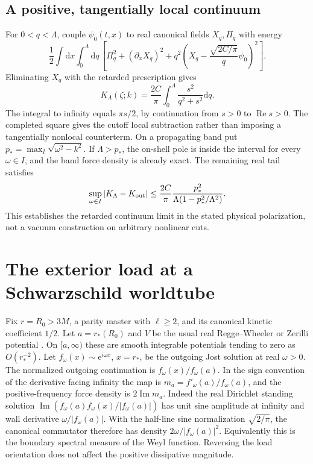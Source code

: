 \documentclass[11pt]{article}
\newcommand{\dd}{\mathrm d}
\newcommand{\e}{\mathrm e}
\begin{document}
\subsection{A positive, tangentially local continuum}
For \(0<q<\Lambda\), couple \(\psi_0(t,x)\) to real canonical fields \(X_q,\Pi_q\) with energy
\[
 \frac12\int\dd x\int_0^\Lambda\dd q\,
 \left[\Pi_q^2+(\partial_x X_q)^2+
 q^2\left(X_q-\frac{\sqrt{2C/\pi}}q\psi_0\right)^2\right].
\]
Eliminating \(X_q\) with the retarded prescription gives
\[
 K_\Lambda(\zeta;k)=\frac{2C}{\pi}\int_0^\Lambda
 \frac{s^2}{q^2+s^2}\dd q .
\]
The integral to infinity equals \(\pi s/2\), by continuation from \(s>0\) to \(\operatorname{Re}s>0\). The completed square gives the cutoff local subtraction rather than imposing a tangentially nonlocal counterterm. On a propagating band put \(p_*=\max_I\sqrt{\omega^2-k^2}\). If \(\Lambda>p_*\), the on-shell pole is inside the interval for every \(\omega\in I\), and the band force density is already exact. The remaining real tail satisfies
\[
 \sup_{\omega\in I}|K_\Lambda-K_{\rm out}|
 \le\frac{2C}{\pi}\frac{p_*^2}{\Lambda(1-p_*^2/\Lambda^2)}.
\]
This establishes the retarded continuum limit in the stated physical polarization, not a vacuum construction on arbitrary nonlinear cuts.

\section{The exterior load at a Schwarzschild worldtube}
Fix \(r=R_0>3M\), a parity master with \(\ell\ge2\), and its canonical kinetic coefficient \(1/2\). Let \(a=r_*(R_0)\) and \(V\) be the usual real Regge--Wheeler or Zerilli potential \cite{Lau}. On \([a,\infty)\) these are smooth integrable potentials tending to zero as \(O(r_*^{-2})\). Let \(f_\omega(x)\sim\e^{i\omega x}\), \(x=r_*\), be the outgoing Jost solution at real \(\omega>0\). The normalized outgoing continuation is \(f_\omega(x)/f_\omega(a)\). In the sign convention of the derivative facing infinity the map is \(m_a=f'_\omega(a)/f_\omega(a)\), and the positive-frequency force density is \(2\operatorname{Im}m_a\). Indeed the real Dirichlet standing solution \(\operatorname{Im}(\overline f_\omega(a)f_\omega(x)/|f_\omega(a)|)\) has unit sine amplitude at infinity and wall derivative \(\omega/|f_\omega(a)|\). With the half-line sine normalization \(\sqrt{2/\pi}\), the canonical commutator therefore has density \(2\omega/|f_\omega(a)|^2\). Equivalently this is the boundary spectral measure of the Weyl function. Reversing the load orientation does not affect the positive dissipative magnitude.
\end{document}
